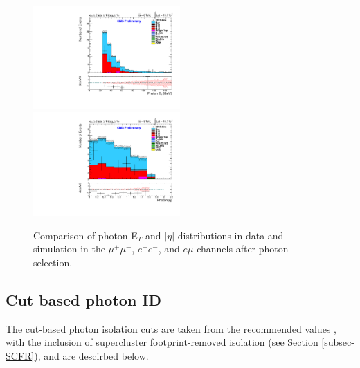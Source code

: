 \begin{figure}
\includegraphics[width=0.5\textwidth]{Plots/ControlPlots/TTbarPhotonAnalysis/EMu/Photons/SignalPhotons/Photon_ET_splitTTbar_ratio.pdf}
\includegraphics[width=0.5\textwidth]{Plots/ControlPlots/TTbarPhotonAnalysis/EMu/Photons/SignalPhotons/Photon_AbsEta_splitTTbar_ratio.pdf} 
\caption{Comparison of photon E$_{T}$ and $|\eta|$ distributions in data and simulation in the $\mu^{+}\mu^{-}$, $e^{+}e^{-}$, and $e\mu$ channels after photon selection.}
\label{fig-photonSelectionETandEta}
\end{figure}



\subsection{Cut based photon ID}

The cut-based photon isolation cuts are taken from the recommended values \cite{CutBasedIsolation2012}, with the inclusion of supercluster footprint-removed isolation (see Section \ref{subsec-SCFR}), and are descirbed below.

